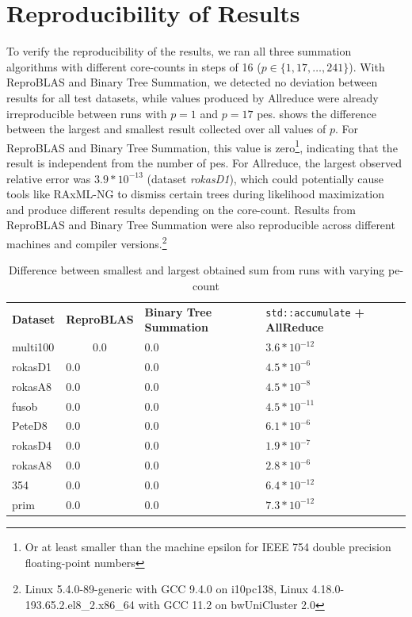 \section{Reproducibility of Results}
\label{sec:VerificationOfReproducibility}
To verify the reproducibility of the results, we ran all three summation algorithms with different core-counts in steps of 16 ($p \in \{1, 17, \ldots, 241 \}$).
With ReproBLAS and Binary Tree Summation, we detected no deviation between results for all test datasets, while values produced by Allreduce were already  irreproducible between runs with $p=1$ and $p=17$ \glspl{pe}.
 shows the difference between the largest and smallest result collected over all values of $p$.
For ReproBLAS and Binary Tree Summation, this value is zero\footnote{Or at least smaller than the machine epsilon for IEEE 754 double precision floating-point numbers}, indicating that the result is independent from the number of \glspl{pe}.
For Allreduce, the largest observed relative error was $3.9 * 10^{-13}$ (dataset \textit{rokasD1}), which could potentially cause tools like RAxML-NG to dismiss certain trees during likelihood maximization and produce different results depending on the core-count.
Results from ReproBLAS and Binary Tree Summation were also reproducible across different machines and compiler versions.\footnote{Linux 5.4.0-89-generic with GCC 9.4.0 on i10pc138, Linux 4.18.0-193.65.2.el8\_2.x86\_64 with GCC 11.2 on bwUniCluster 2.0}

\begin{table}
\centering
\begin{tabular}{llll}
\textbf{Dataset} & \textbf{ReproBLAS }& \textbf{Binary Tree Summation} & \texttt{std::accumulate}\textbf{ + AllReduce} \\
multi100 & $$0.0$$ & $0.0$ & $3.6 * 10^{-12}$ \\
rokasD1 & $0.0$ & $0.0$ & $4.5 * 10^{-6}$ \\
rokasA8 & $0.0$ & $0.0$ & $4.5 * 10^{-8}$ \\
fusob & $0.0$ & $0.0$ & $4.5 * 10^{-11}$ \\
PeteD8 & $0.0$ & $0.0$ & $6.1 * 10^{-6}$ \\
rokasD4 & $0.0$ & $0.0$ & $1.9 * 10^{-7}$ \\
rokasA8 & $0.0$ & $0.0$ & $2.8 * 10^{-6}$ \\
354 & $0.0$ & $0.0$ & $6.4 * 10^{-12}$ \\
prim & $0.0$ & $0.0$ & $7.3 * 10^{-12}$
\end{tabular}
\caption{Difference between smallest and largest obtained sum from runs with varying \gls{pe}-count}
\label{table:runDeviation}
\end{table}

